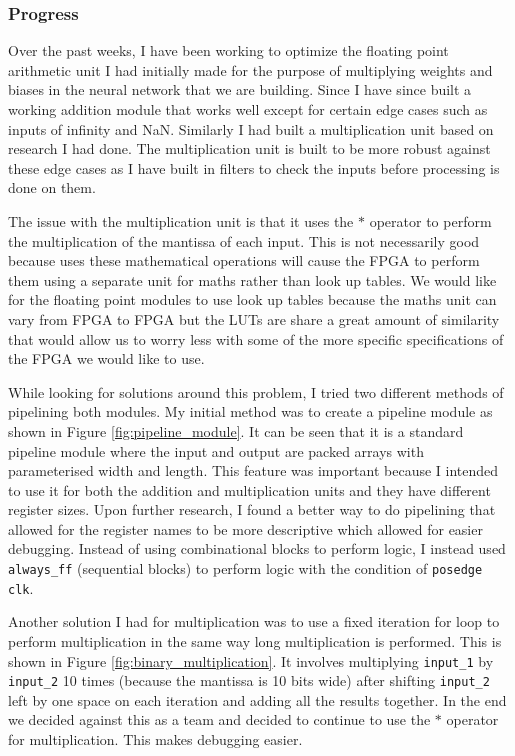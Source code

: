 \subsubsection{Progress}
Over the past weeks, I have been working to optimize the floating point arithmetic unit I had initially made for the purpose of multiplying weights and biases in the neural network that we are building. Since I have since built a working addition module that works well except for certain edge cases such as inputs of infinity and NaN. Similarly I had built a multiplication unit based on research I had done. The multiplication unit is built to be more robust against these edge cases as I have built in filters to check the inputs before processing is done on them.\newline

The issue with the multiplication unit is that it uses the $*$ operator to perform the multiplication of the mantissa of each input. This is not necessarily good because uses these mathematical operations will cause the FPGA to perform them using a separate unit for maths rather than look up tables. We would like for the floating point modules to use look up tables because the maths unit can vary from FPGA to FPGA but the LUTs are share a great amount of similarity that would allow us to worry less with some of the more specific specifications of the FPGA we would like to use.\newline

While looking for solutions around this problem, I tried two different methods of pipelining both modules. My initial method was to create a pipeline module as shown in Figure \ref{fig:pipeline_module}. It can be seen that it is a standard pipeline module where the input and output are packed arrays with parameterised width and length. This feature was important because I intended to use it for both the addition and multiplication units and they have different register sizes. Upon further research, I found a better way to do pipelining that allowed for the register names to be more descriptive which allowed for easier debugging. Instead of using combinational blocks to perform logic, I instead used \texttt{always\_ff} (sequential blocks) to perform logic with the condition of \texttt{posedge clk}. \newline

Another solution I had for multiplication was to use a fixed iteration for loop to perform multiplication in the same way long multiplication is performed. This is shown in Figure \ref{fig:binary_multiplication}. It involves multiplying \texttt{input\_1} by \texttt{input\_2} 10 times (because the mantissa is 10 bits wide) after shifting \texttt{input\_2} left by one space on each iteration and adding all the results together. In the end we decided against this as a team and decided to continue to use the $*$ operator for multiplication. This makes debugging easier. 

